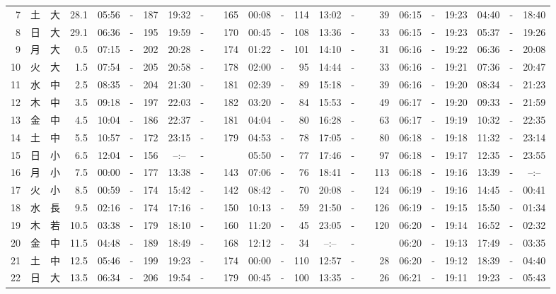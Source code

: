 \documentclass[12pt,a4j]{jsarticle}
\begin{document}
\begin{table}[htbp]
\begin{center}
{\begin{tabular}{|rc|cr|ccrccr|ccrccr|ccc|ccc|}
 7 & 土 & 大 & 28.1 &  05:56 &-& 187 &  19:32 &-& 165 &  00:08 &-& 114 &  13:02 &-&  39 & 06:15 & -& 19:23 & 04:40 & -& 18:40 \\
 8 & 日 & 大 & 29.1 &  06:36 &-& 195 &  19:59 &-& 170 &  00:45 &-& 108 &  13:36 &-&  33 & 06:15 & -& 19:23 & 05:37 & -& 19:26 \\
 9 & 月 & 大 &  0.5 &  07:15 &-& 202 &  20:28 &-& 174 &  01:22 &-& 101 &  14:10 &-&  31 & 06:16 & -& 19:22 & 06:36 & -& 20:08 \\
10 & 火 & 大 &  1.5 &  07:54 &-& 205 &  20:58 &-& 178 &  02:00 &-&  95 &  14:44 &-&  33 & 06:16 & -& 19:21 & 07:36 & -& 20:47 \\
11 & 水 & 中 &  2.5 &  08:35 &-& 204 &  21:30 &-& 181 &  02:39 &-&  89 &  15:18 &-&  39 & 06:16 & -& 19:20 & 08:34 & -& 21:23 \\
12 & 木 & 中 &  3.5 &  09:18 &-& 197 &  22:03 &-& 182 &  03:20 &-&  84 &  15:53 &-&  49 & 06:17 & -& 19:20 & 09:33 & -& 21:59 \\
13 & 金 & 中 &  4.5 &  10:04 &-& 186 &  22:37 &-& 181 &  04:04 &-&  80 &  16:28 &-&  63 & 06:17 & -& 19:19 & 10:32 & -& 22:35 \\
14 & 土 & 中 &  5.5 &  10:57 &-& 172 &  23:15 &-& 179 &  04:53 &-&  78 &  17:05 &-&  80 & 06:18 & -& 19:18 & 11:32 & -& 23:14 \\
15 & 日 & 小 &  6.5 &  12:04 &-& 156 &  --:-- &-&~~~~~ &  05:50 &-&  77 &  17:46 &-&  97 & 06:18 & -& 19:17 & 12:35 & -& 23:55 \\
16 & 月 & 小 &  7.5 &  00:00 &-& 177 &  13:38 &-& 143 &  07:06 &-&  76 &  18:41 &-& 113 & 06:18 & -& 19:16 & 13:39 & -& --:-- \\
17 & 火 & 小 &  8.5 &  00:59 &-& 174 &  15:42 &-& 142 &  08:42 &-&  70 &  20:08 &-& 124 & 06:19 & -& 19:16 & 14:45 & -& 00:41 \\
18 & 水 & 長 &  9.5 &  02:16 &-& 174 &  17:16 &-& 150 &  10:13 &-&  59 &  21:50 &-& 126 & 06:19 & -& 19:15 & 15:50 & -& 01:34 \\
19 & 木 & 若 & 10.5 &  03:38 &-& 179 &  18:10 &-& 160 &  11:20 &-&  45 &  23:05 &-& 120 & 06:20 & -& 19:14 & 16:52 & -& 02:32 \\
20 & 金 & 中 & 11.5 &  04:48 &-& 189 &  18:49 &-& 168 &  12:12 &-&  34 &  --:-- &-&~~~~~ & 06:20 & -& 19:13 & 17:49 & -& 03:35 \\
21 & 土 & 中 & 12.5 &  05:46 &-& 199 &  19:23 &-& 174 &  00:00 &-& 110 &  12:57 &-&  28 & 06:20 & -& 19:12 & 18:39 & -& 04:40 \\
22 & 日 & 大 & 13.5 &  06:34 &-& 206 &  19:54 &-& 179 &  00:45 &-& 100 &  13:35 &-&  26 & 06:21 & -& 19:11 & 19:23 & -& 05:43 \\

\end{tabular}}
\end{center}
\end{table}
\end{document}
